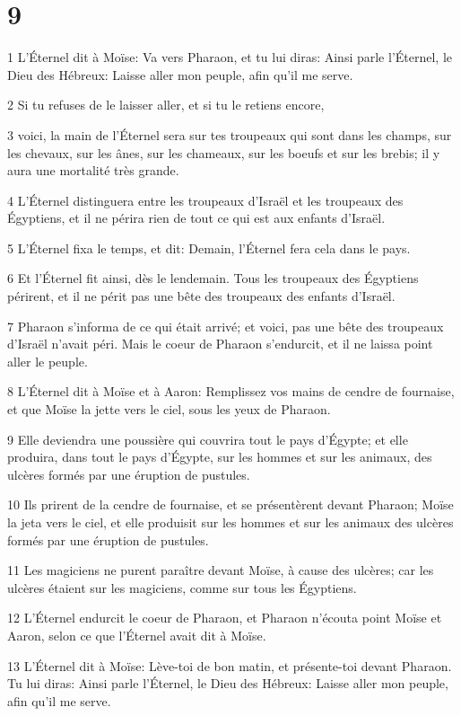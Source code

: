 \chapter{9}

\par 1 L'Éternel dit à Moïse: Va vers Pharaon, et tu lui diras: Ainsi parle l'Éternel, le Dieu des Hébreux: Laisse aller mon peuple, afin qu'il me serve.
\par 2 Si tu refuses de le laisser aller, et si tu le retiens encore,
\par 3 voici, la main de l'Éternel sera sur tes troupeaux qui sont dans les champs, sur les chevaux, sur les ânes, sur les chameaux, sur les boeufs et sur les brebis; il y aura une mortalité très grande.
\par 4 L'Éternel distinguera entre les troupeaux d'Israël et les troupeaux des Égyptiens, et il ne périra rien de tout ce qui est aux enfants d'Israël.
\par 5 L'Éternel fixa le temps, et dit: Demain, l'Éternel fera cela dans le pays.
\par 6 Et l'Éternel fit ainsi, dès le lendemain. Tous les troupeaux des Égyptiens périrent, et il ne périt pas une bête des troupeaux des enfants d'Israël.
\par 7 Pharaon s'informa de ce qui était arrivé; et voici, pas une bête des troupeaux d'Israël n'avait péri. Mais le coeur de Pharaon s'endurcit, et il ne laissa point aller le peuple.
\par 8 L'Éternel dit à Moïse et à Aaron: Remplissez vos mains de cendre de fournaise, et que Moïse la jette vers le ciel, sous les yeux de Pharaon.
\par 9 Elle deviendra une poussière qui couvrira tout le pays d'Égypte; et elle produira, dans tout le pays d'Égypte, sur les hommes et sur les animaux, des ulcères formés par une éruption de pustules.
\par 10 Ils prirent de la cendre de fournaise, et se présentèrent devant Pharaon; Moïse la jeta vers le ciel, et elle produisit sur les hommes et sur les animaux des ulcères formés par une éruption de pustules.
\par 11 Les magiciens ne purent paraître devant Moïse, à cause des ulcères; car les ulcères étaient sur les magiciens, comme sur tous les Égyptiens.
\par 12 L'Éternel endurcit le coeur de Pharaon, et Pharaon n'écouta point Moïse et Aaron, selon ce que l'Éternel avait dit à Moïse.
\par 13 L'Éternel dit à Moïse: Lève-toi de bon matin, et présente-toi devant Pharaon. Tu lui diras: Ainsi parle l'Éternel, le Dieu des Hébreux: Laisse aller mon peuple, afin qu'il me serve.
